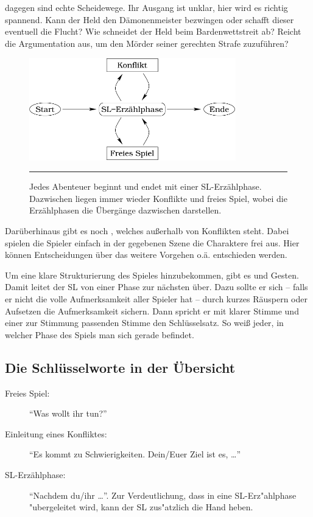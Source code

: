  dagegen sind echte Scheidewege. Ihr Ausgang ist unklar, hier wird es richtig spannend. Kann der Held den Dämonenmeister bezwingen oder schafft dieser eventuell die Flucht? Wie schneidet der Held beim Bardenwettstreit ab? Reicht die Argumentation aus, um den Mörder seiner gerechten Strafe zuzuführen?

\begin{figure}[t!]
\centerline{\includegraphics[width=0.8\textwidth]{pics/flowchart}}
\caption{Jedes Abenteuer beginnt und endet mit einer SL-Erzählphase. Dazwischen liegen immer wieder Konflikte und freies Spiel, wobei die Erzählphasen die Übergänge dazwischen darstellen.}

\medskip
\hrule
\end{figure}

Darüberhinaus gibt es noch , welches außerhalb von Konflikten steht. Dabei spielen die Spieler einfach in der gegebenen Szene die Charaktere frei aus. Hier können Entscheidungen über das weitere Vorgehen o.ä. entschieden werden.

Um eine klare Strukturierung des Spieles hinzubekommen, gibt es  und Gesten. Damit leitet der SL von einer Phase zur nächsten über. Dazu sollte er sich -- falls er nicht die volle Aufmerksamkeit aller Spieler hat -- durch kurzes Räuspern oder Aufsetzen die Aufmerksamkeit sichern. Dann spricht er mit klarer Stimme und einer zur Stimmung passenden Stimme den Schlüsselsatz. So weiß jeder, in welcher Phase des Spiels man sich gerade befindet.

\subsection{Die Schlüsselworte in der Übersicht}
\begin{description}
\item[Freies Spiel:] ``Was wollt ihr tun?''

\item[Einleitung eines Konfliktes:] ``Es kommt zu Schwierigkeiten. Dein/Euer Ziel ist es, \dots''

\item[SL-Erzählphase:] ``Nachdem du/ihr \dots''. Zur Verdeutlichung, dass in eine SL-Erz"ahlphase "ubergeleitet wird, kann der SL zus"atzlich die Hand heben.
\end{description}


